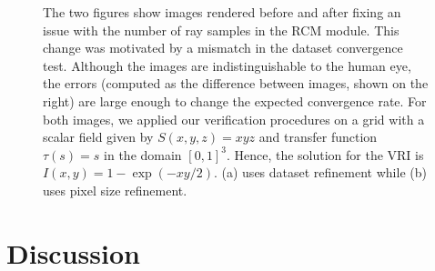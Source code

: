 \begin{figure}[b]
\centering 
{}
\caption{\label{fig:problem-example-01} The two figures show images
  rendered before and after fixing an issue with the number of ray
  samples in the RCM module. This change was motivated by a mismatch
  in the dataset convergence test. Although the images are
  indistinguishable to the human eye, the errors (computed as the
  difference between images, shown on the right) are large enough to
  change the expected convergence rate. For both images, we applied our
  verification procedures on a grid with a scalar field given by
  $S(x,y,z) = xyz$ and transfer function $\tau(s) = s$ in the domain
  $\left[0,1\right]^3$. Hence, the solution for the VRI is $I(x,y) =
  1-\exp\left( -x y / 2 \right)$. (a) uses dataset refinement while
  (b) uses pixel size refinement.}
\end{figure}


\section{Discussion}
\label{chap5:sec:discussion}

